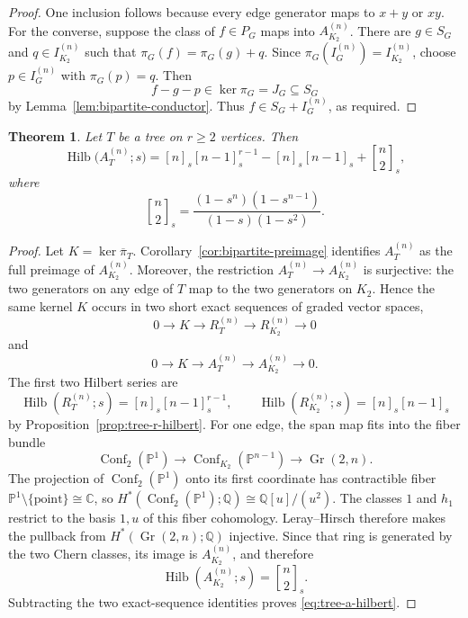 \documentclass[11pt]{amsart}
\theoremstyle{plain}
\newtheorem{theorem}{Theorem}[section]
\theoremstyle{definition}
\theoremstyle{remark}
\newcommand{\Q}{\mathbb{Q}}
\newcommand{\C}{\mathbb{C}}
\newcommand{\PP}{\mathbb{P}}
\newcommand{\Conf}{\operatorname{Conf}}
\newcommand{\Gr}{\operatorname{Gr}}
\newcommand{\qbinom}[2]{\genfrac{[}{]}{0pt}{}{#1}{#2}}
\begin{document}
\begin{proof}
One inclusion follows because every edge generator maps to $x+y$ or $xy$.
For the converse, suppose the class of $f\in P_G$ maps into
$A_{K_2}^{(n)}$.  There are $g\in S_G$ and $q\in I_{K_2}^{(n)}$ such that
$\pi_G(f)=\pi_G(g)+q$.  Since
$\pi_G(I_G^{(n)})=I_{K_2}^{(n)}$, choose $p\in I_G^{(n)}$ with
$\pi_G(p)=q$.  Then
\[
  f-g-p\in\ker\pi_G=J_G\subseteq S_G
\]
by Lemma~\ref{lem:bipartite-conductor}.  Thus
$f\in S_G+I_G^{(n)}$, as required.
\end{proof}

\begin{theorem}\label{thm:tree-a-hilbert}
Let $T$ be a tree on $r\geq2$ vertices.  Then
\begin{equation}\label{eq:tree-a-hilbert}
  \operatorname{Hilb}\bigl(A_T^{(n)};s\bigr)
  =[n]_s[n-1]_s^{r-1}-[n]_s[n-1]_s+\qbinom{n}{2}_s,
\end{equation}
where
\[
  \qbinom{n}{2}_s
  =\frac{(1-s^n)(1-s^{n-1})}{(1-s)(1-s^2)}.
\]
\end{theorem}

\begin{proof}
Let $K=\ker\overline\pi_T$.  Corollary~\ref{cor:bipartite-preimage}
identifies $A_T^{(n)}$ as the full preimage of $A_{K_2}^{(n)}$.  Moreover, the
restriction $A_T^{(n)}\to A_{K_2}^{(n)}$ is surjective: the two generators on
any edge of $T$ map to the two generators on $K_2$.  Hence the same kernel $K$
occurs in two short exact sequences of graded vector spaces,
\[
  0\longrightarrow K\longrightarrow R_T^{(n)}
  \longrightarrow R_{K_2}^{(n)}\longrightarrow0
\]
and
\[
  0\longrightarrow K\longrightarrow A_T^{(n)}
  \longrightarrow A_{K_2}^{(n)}\longrightarrow0.
\]
The first two Hilbert series are
\[
  \operatorname{Hilb}(R_T^{(n)};s)=[n]_s[n-1]_s^{r-1},
  \qquad
  \operatorname{Hilb}(R_{K_2}^{(n)};s)=[n]_s[n-1]_s
\]
by Proposition~\ref{prop:tree-r-hilbert}.  For one edge, the span map fits
into the fiber bundle
\[
  \Conf_2(\PP^1)\longrightarrow
  \Conf_{K_2}(\PP^{n-1})\longrightarrow\Gr(2,n).
\]
The projection of $\Conf_2(\PP^1)$ onto its first coordinate has contractible
fiber $\PP^1\setminus\{\mathrm{point}\}\cong\C$, so
$H^*(\Conf_2(\PP^1);\Q)\cong\Q[u]/(u^2)$.  The classes $1$ and $h_1$ restrict
to the basis $1,u$ of this fiber cohomology.  Leray--Hirsch therefore makes the
pullback from $H^*(\Gr(2,n);\Q)$ injective.  Since that ring is generated by
the two Chern classes, its image is
$A_{K_2}^{(n)}$, and therefore
\[
  \operatorname{Hilb}(A_{K_2}^{(n)};s)=\qbinom{n}{2}_s.
\]
Subtracting the two exact-sequence identities proves
\eqref{eq:tree-a-hilbert}.
\end{proof}
\end{document}
